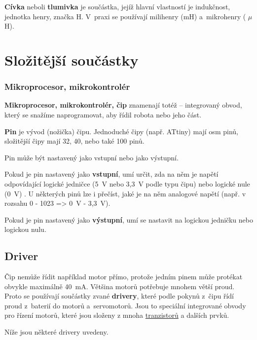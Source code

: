 {\bf Cívka} neboli {\bf tlumivka} je součástka, 
jejíž hlavní vlastností je indukčnost, jednotka henry, značka H.
 V~praxi se používají milihenry (mH) a~mikrohenry ( $\mu$H).

\section{Složitější součástky}

\subsubsection{Mikroprocesor, mikrokontrolér} 

{\bf Mikroprocesor, mikrokontrolér, čip}    
znamenají totéž -- integrovaný obvod, který se snažíme naprogramovat, aby řídil robota nebo jeho část. \label{cip}

{\bf Pin}  \label{pin} je vývod (nožička) čipu. Jednoduché čipy (např. ATtiny) mají osm pinů, složitější čipy mají 32, 40, nebo také 100 pinů.

Pin může být nastavený jako vstupní nebo jako výstupní. 

Pokud je pin nastavený jako {\bf vstupní}, umí určit, zda na něm je napětí odpovídající logické jedničce (5~V nebo 3,3~V podle typu čipu) nebo logické nule (0~V) . 
U některých pinů lze i přečíst, jaké je na něm analogové napětí (např. v rozsahu 0 - 1023 => 0~V - 3,3~V). 

Pokud je pin nastavený jako {\bf výstupní},  umí se nastavit na logickou jedničku nebo logickou nulu. 

\subsection{Driver} \label{driver}

Čip nemůže řídit například motor přímo, protože jedním pinem může protékat obvykle maximálně 40~mA. 
Většina motorů potřebuje mnohem větší proud.
 Proto se používají součástky zvané {\bf drivery}, které podle pokynů z~čipu řídí proud z~baterií do motorů a~servomotorů. 
 Jsou to speciální integrované obvody pro řízení motorů, které jsou složeny z mnoha \hyperref[tranzistor]{tranzistorů} a dalších prvků. 
 
 Níže jsou některé drivery uvedeny. 
 
